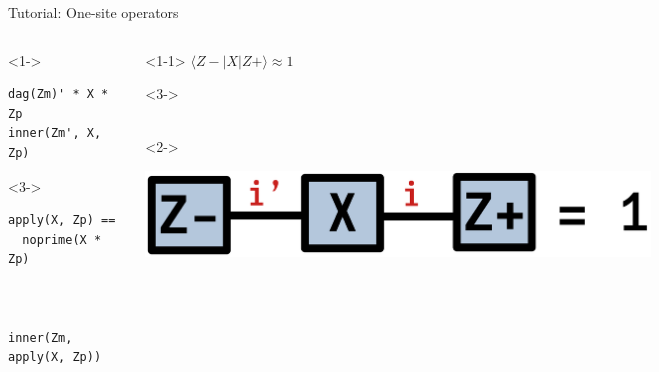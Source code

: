 \begin{frame}[fragile]{Tutorial: One-site operators}

\begin{columns}

\begin{column}{4.5cm}

\begin{onlyenv}<1->
\begin{lstlisting}[language=JuliaLocal, style=julia, basicstyle=\scriptsize\ttfamily]
dag(Zm)' * X * Zp
inner(Zm', X, Zp)
\end{lstlisting}
\end{onlyenv}

\begin{onlyenv}<3->
~\\
\begin{lstlisting}[language=JuliaLocal, style=julia, basicstyle=\scriptsize\ttfamily]
apply(X, Zp) == 
  noprime(X * Zp)



inner(Zm, apply(X, Zp))
\end{lstlisting}
\end{onlyenv}

\end{column}

\begin{column}{4.5cm}

\begin{onlyenv}<1-1>
$\langle Z-|X|Z+\rangle \approx 1$ \\
\end{onlyenv}

\begin{onlyenv}<3->
~\\
~\\
\end{onlyenv}

\begin{onlyenv}<2->
\vspace*{-0.2cm}
\begin{center}
\includegraphics[width=0.7\textwidth]{
  slides/assets/ZmXZp.png
}
\end{center}
\vspace*{0.0cm}
\end{onlyenv}


\end{column}
\end{columns}
\end{frame}
